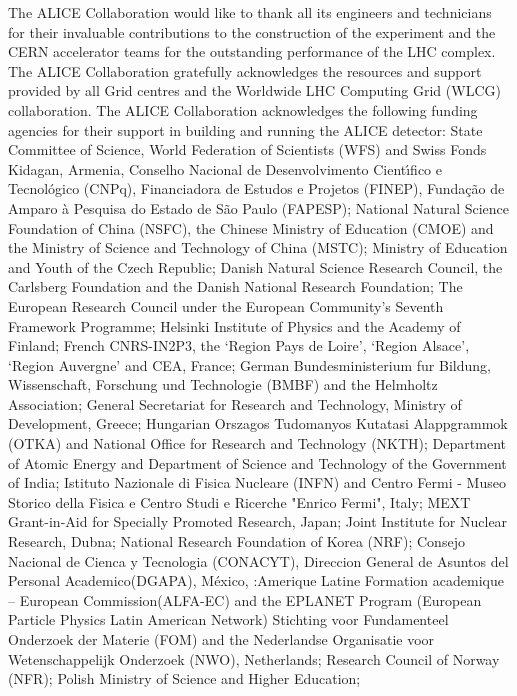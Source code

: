 The ALICE Collaboration would like to thank all its engineers and technicians
for their invaluable contributions to the construction of the experiment and
the CERN accelerator teams for the outstanding performance of the LHC complex.
%
The ALICE Collaboration gratefully acknowledges the resources and support
provided by all Grid centres and the Worldwide LHC Computing Grid (WLCG)
collaboration.
%
The ALICE Collaboration acknowledges the following funding agencies for
their support in building and running the ALICE detector:
%
State Committee of Science,  World Federation of Scientists (WFS)
and Swiss Fonds Kidagan, Armenia,
%
Conselho Nacional de Desenvolvimento Cient\'{\i}fico e Tecnol\'{o}gico (CNPq),
Financiadora de Estudos e Projetos (FINEP),
Funda\c{c}\~{a}o de Amparo \`{a} Pesquisa do Estado de S\~{a}o Paulo (FAPESP);
%
National Natural Science Foundation of China (NSFC),
the Chinese Ministry of Education (CMOE)
and the Ministry of Science and Technology of China (MSTC);
%
Ministry of Education and Youth of the Czech Republic;
%
Danish Natural Science Research Council,
the Carlsberg Foundation and the Danish National Research Foundation;
%
The European Research Council under the European Community's
Seventh Framework Programme;
%
Helsinki Institute of Physics and the Academy of Finland;
%
French CNRS-IN2P3,
the `Region Pays de Loire', `Region Alsace', `Region Auvergne' and CEA, France;
%
German Bundesministerium fur Bildung, Wissenschaft,
Forschung und Technologie (BMBF) and the Helmholtz Association;
%
General Secretariat for Research and Technology, Ministry of
Development, Greece;
%
Hungarian Orszagos Tudomanyos Kutatasi Alappgrammok (OTKA) and
National Office for Research and Technology (NKTH);
%
Department of Atomic Energy and Department of Science and Technology of the
Government of India;
%
Istituto Nazionale di Fisica Nucleare (INFN) and Centro Fermi -
Museo Storico della Fisica e Centro Studi e Ricerche "Enrico Fermi", Italy;
%
MEXT Grant-in-Aid for Specially Promoted Research, Ja\-pan;
%
Joint Institute for Nuclear Research, Dubna;
%
National Research Foundation of Korea (NRF);
%
Consejo Nacional de Cienca y Tecnologia (CONACYT),
Direccion General de Asuntos del Personal Academico(DGAPA),
M\'{e}xico, :Amerique Latine Formation academique –
European Commission(ALFA-EC) and the EPLANET Program (European
Particle Physics Latin American Network)
%
Stichting voor Fundamenteel Onderzoek der Materie (FOM) and
the Nederlandse Organisatie voor Wetenschappelijk Onderzoek (NWO), Netherlands;
%
Research Council of Norway (NFR);
%
Polish Ministry of Science and Higher Education;

